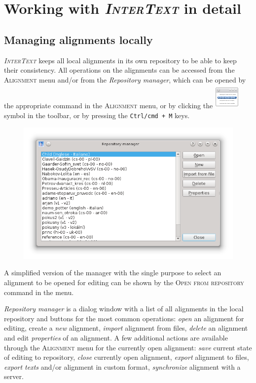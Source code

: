 \documentclass[a4paper,10pt,oneside]{book}
\newcommand{\IT}{\textit{\textsc{InterText}}\xspace}
\newcommand{\keys}[1]{\texttt{#1}}
\newcommand{\menu}[1]{\textsc{#1}}
\begin{document}
\part{Working with \IT in detail}\label{p:detail}

\chapter{Managing alignments locally}\label{ch:detail:managing_local}

\IT keeps all local alignments in its own repository to be able to keep their consistency. All operations on the alignments can be accessed from the \menu{Alignment} menu and/or from the \emph{Repository manager}, which can be opened by the appropriate command in the \menu{Alignment} menu, or by clicking the \includegraphics[height=2ex]{../images/48/manager.png} symbol in the toolbar, or by pressing the \keys{Ctrl/cmd + M} keys.

\begin{figure}[htbf]
 \includegraphics[width=\textwidth]{screenshots/rep_manager.png}
\end{figure}

A simplified version of the manager with the single purpose to select an alignment to be opened for editing can be shown by the \menu{Open from repository} command in the menu.

\emph{Repository manager} is a dialog window with a list of all alignments in the local repository and buttons for the most common operations: \emph{open} an alignment for editing, create a \emph{new} alignment, \emph{import} alignment from files, \emph{delete} an alignment and edit \emph{properties} of an alignment. A few additional actions are available through the \menu{Alignment} menu for the currently open alignment: \emph{save} current state of editing to repository, \emph{close} currently open alignment, \emph{export} alignment to files, \emph{export texts} and/or alignment in custom format, \emph{synchronize} alignment with a server.
\end{document}
